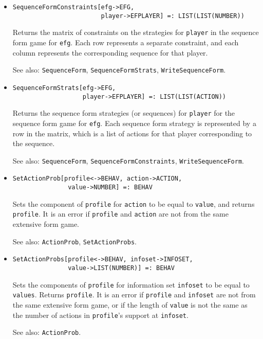 \begin{itemize}
\item{}
\protect \large \begin{verbatim} 
SequenceFormConstraints[efg->EFG, 
                        player->EFPLAYER] =: LIST(LIST(NUMBER))
\end{verbatim}\normalsize

\bd Returns the matrix of constraints on the strategies for
\verb+player+ in the sequence form game for \verb+efg+.  Each row
represents a separate constraint, and each column represents the
corresponding sequence for that player.
\item [See also:] \verb+SequenceForm+,
\verb+SequenceFormStrats+, \verb+WriteSequenceForm+.
\ed

\item{}
\protect \large \begin{verbatim} 
SequenceFormStrats[efg->EFG, 
                   player->EFPLAYER] =: LIST(LIST(ACTION))
\end{verbatim}\normalsize

\bd 
Returns the sequence form strategies (or sequences) for
\verb+player+ for the sequence form game for \verb+efg+. Each
sequence form strategy is represented by a row in the matrix, which is
a list of actions for that player corresponding to the sequence.  
\item [See also:] \verb+SequenceForm+,
\verb+SequenceFormConstraints+, \verb+WriteSequenceForm+.
\ed

\item{}
\protect \large \begin{verbatim} 
SetActionProb[profile<->BEHAV, action->ACTION, 
               value->NUMBER] =: BEHAV 
\end{verbatim}\normalsize

\bd
Sets the component of \verb+profile+ for
\verb+action+ to be equal to \verb+value+, and 
returns \verb+profile+.  It is an error if \verb+profile+ and \verb+action+
are not from the same extensive form game. 
\item [See also:] \verb+ActionProb+, \verb+SetActionProbs+.
\ed

\item{}
\protect \large \begin{verbatim} 
SetActionProbs[profile<->BEHAV, infoset->INFOSET, 
               value->LIST(NUMBER)] =: BEHAV 
\end{verbatim}\normalsize

\bd
Sets the components of \verb+profile+ for
information set \verb+infoset+ to be equal to \verb+values+.
Returns \verb+profile+.  It is an error if \verb+profile+ and \verb+infoset+
are not from the same extensive form game, or if the length of
\verb+value+ is not the same as the number of actions in \verb+profile+'s
support at \verb+infoset+.
\item [See also:] \verb+ActionProb+.
\ed


\end{itemize}

